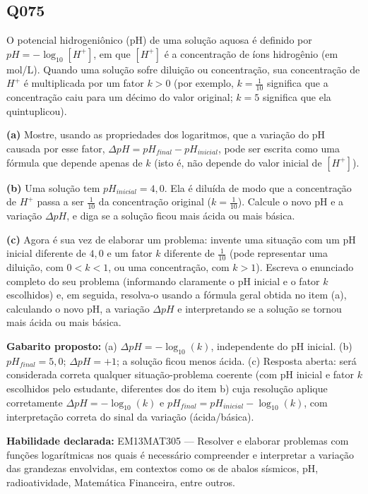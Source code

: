 \documentclass[11pt,a4paper]{article}
\begin{document}
\begin{samepage}
\subsection*{Q075}
O potencial hidrogeniônico (pH) de uma solução aquosa é definido por $pH = -\log_{10}[H^+]$, em que $[H^+]$ é a concentração de íons hidrogênio (em mol/L). Quando uma solução sofre diluição ou concentração, sua concentração de $H^+$ é multiplicada por um fator $k>0$ (por exemplo, $k = \tfrac{1}{10}$ significa que a concentração caiu para um décimo do valor original; $k=5$ significa que ela quintuplicou).

\textbf{(a)} Mostre, usando as propriedades dos logaritmos, que a variação do pH causada por esse fator, $\Delta pH = pH_{final} - pH_{inicial}$, pode ser escrita como uma fórmula que depende apenas de $k$ (isto é, não depende do valor inicial de $[H^+]$).

\textbf{(b)} Uma solução tem $pH_{inicial} = 4{,}0$. Ela é diluída de modo que a concentração de $H^+$ passa a ser $\tfrac{1}{10}$ da concentração original ($k = \tfrac{1}{10}$). Calcule o novo pH e a variação $\Delta pH$, e diga se a solução ficou mais ácida ou mais básica.

\textbf{(c)} Agora é sua vez de elaborar um problema: invente uma situação com um pH inicial diferente de $4{,}0$ e um fator $k$ diferente de $\tfrac{1}{10}$ (pode representar uma diluição, com $0<k<1$, ou uma concentração, com $k>1$). Escreva o enunciado completo do seu problema (informando claramente o pH inicial e o fator $k$ escolhidos) e, em seguida, resolva-o usando a fórmula geral obtida no item (a), calculando o novo pH, a variação $\Delta pH$ e interpretando se a solução se tornou mais ácida ou mais básica.

\textbf{Gabarito proposto:} (a) $\Delta pH = -\log_{10}(k)$, independente do pH inicial. (b) $pH_{final}=5{,}0$; $\Delta pH = +1$; a solução ficou menos ácida. (c) Resposta aberta: será considerada correta qualquer situação-problema coerente (com pH inicial e fator $k$ escolhidos pelo estudante, diferentes dos do item b) cuja resolução aplique corretamente $\Delta pH=-\log_{10}(k)$ e $pH_{final}=pH_{inicial}-\log_{10}(k)$, com interpretação correta do sinal da variação (ácida/básica).

\textbf{Habilidade declarada:} EM13MAT305 --- Resolver e elaborar problemas com funções logarítmicas nos quais é necessário compreender e interpretar a variação das grandezas envolvidas, em contextos como os de abalos sísmicos, pH, radioatividade, Matemática Financeira, entre outros.
\end{samepage}
\end{document}
